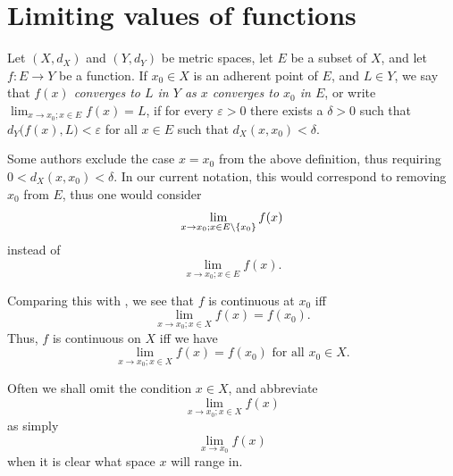 \section{Limiting values of functions}\label{ii:sec:3.1}

\begin{defn}\label{ii:3.1.1}
  Let \((X, d_X)\) and \((Y, d_Y)\) be metric spaces, let \(E\) be a subset of \(X\), and let \(f : E \to Y\) be a function.
  If \(x_0 \in X\) is an adherent point of \(E\), and \(L \in Y\), we say that \emph{\(f(x)\) converges to \(L\) in \(Y\) as \(x\) converges to \(x_0\) in \(E\)}, or write \(\lim_{x \to x_0 ; x \in E} f(x) = L\), if for every \(\varepsilon > 0\) there exists a \(\delta > 0\) such that \(d_Y\big(f(x), L\big) < \varepsilon\) for all \(x \in E\) such that \(d_X(x, x_0) < \delta\).
\end{defn}

\begin{rmk}\label{ii:3.1.2}
  Some authors exclude the case \(x = x_0\) from the above definition, thus requiring \(0 < d_X(x, x_0) < \delta\).
  In our current notation, this would correspond to removing \(x_0\) from \(E\), thus one would consider
  \[
    \lim_{x \to x_0 ; x \in E \setminus \left\lbrace x_0\right\rbrace} f(x)
  \]
  instead of
  \[
    \lim_{x \to x_0 ; x \in E} f(x).
  \]
\end{rmk}

\begin{note}
  Comparing this with , we see that \(f\) is continuous at \(x_0\) iff
  \[
    \lim_{x \to x_0 ; x \in X} f(x) = f(x_0).
  \]
  Thus, \(f\) is continuous on \(X\) iff we have
  \[
    \lim_{x \to x_0 ; x \in X} f(x) = f(x_0) \text{ for all } x_0 \in X.
  \]
\end{note}

\setcounter{thm}{3}
\begin{rmk}\label{ii:3.1.4}
  Often we shall omit the condition \(x \in X\), and abbreviate
  \[
    \lim_{x \to x_0 ; x \in X} f(x)
  \]
  as simply
  \[
    \lim_{x \to x_0} f(x)
  \]
  when it is clear what space \(x\) will range in.
\end{rmk}

